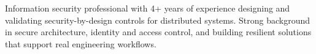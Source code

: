 



\vspace{6pt}

\begin{cvparagraph}
Information security professional with 4+ years of experience designing and validating security-by-design controls for distributed systems. Strong background in secure architecture, identity and access control, and building resilient solutions that support real engineering workflows.
\end{cvparagraph}

\vspace{2mm}

